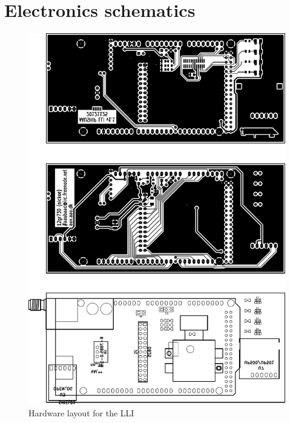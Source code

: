 \chapter{Electronics schematics}
\label{chap:schema}


\begin{figure}
\centering
\includegraphics{img/lli-hw}
\caption{Hardware layout for the LLI}
\label{fig:lli-hw}
\end{figure}



\label{appendices:bow thruster schematic}

